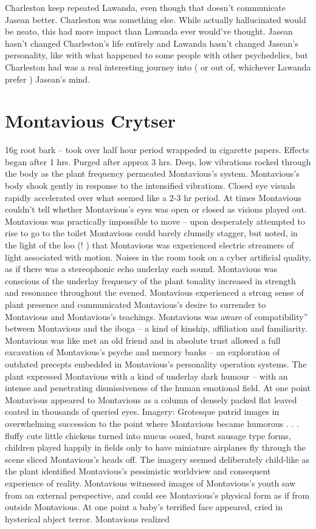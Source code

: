 \documentclass[12pt]{book}
\begin{document}
Charleston keep repeated Lawanda, even though that doesn't communicate Jasean better. Charleston was something else. While actually hallucinated would be neato, this had more impact than Lawanda ever would've thought. Jasean hasn't changed Charleston's life entirely and Lawanda hasn't changed Jasean's personality, like with what happened to some people with other psychedelics, but Charleston had was a real interesting journey into ( or out of, whichever Lawanda prefer ) Jasean's mind.



\chapter{Montavious Crytser}

16g root bark -- took over half hour period wrappeded in cigarette papers. Effects began after 1  hrs. Purged after approx 3 hrs. Deep, low vibrations rocked through the body as the plant frequency permeated Montavious's system. Montavious's body shook gently in response to the intensified vibrations. Closed eye visuals rapidly accelerated over what seemed like a 2-3 hr period. At times Montavious couldn't tell whether Montavious's eyes was open or closed as visions played out. Montavious was practically impossible to move -- upon desperately attempted to rise to go to the toilet Montavious could barely clumsily stagger, but noted, in the light of the loo (! ) that Montavious was experienced electric streamers of light associated with motion. Noises in the room took on a cyber artificial quality, as if there was a stereophonic echo underlay each sound. Montavious was conscious of the underlay frequency of the plant tonality increased in strength and resonance throughout the evened. Montavious experienced a strong sense of plant presence and communicated Montavious's desire to surrender to Montavious and Montavious's teachings. Montavious was aware of compatibility'' between Montavious and the iboga -- a kind of kinship, affiliation and familiarity. Montavious was like met an old friend and in absolute trust allowed a full excavation of Montavious's psyche and memory banks -- an exploration of outdated precepts embedded in Montavious's personality operation systems. The plant expressed Montavious with a kind of underlay dark humour -- with an intense and penetrating dismissiveness of the human emotional field. At one point Montavious appeared to Montavious as a column of densely packed flat leaved coated in thousands of queried eyes. Imagery: Grotesque putrid images in overwhelming succession to the point where Montavious became humorous . . .  fluffy cute little chickens turned into mucus oozed, burst sausage type forms, children played happily in fields only to have miniature airplanes fly through the scene sliced Montavious's heads off. The imagery seemed deliberately child-like as the plant identified Montavious's pessimistic worldview and consequent experience of reality. Montavious witnessed images of Montavious's youth saw from an external perspective, and could see Montavious's physical form as if from outside Montavious. At one point a baby's terrified face appeared, cried in hysterical abject terror. Montavious realized 
\end{document}
